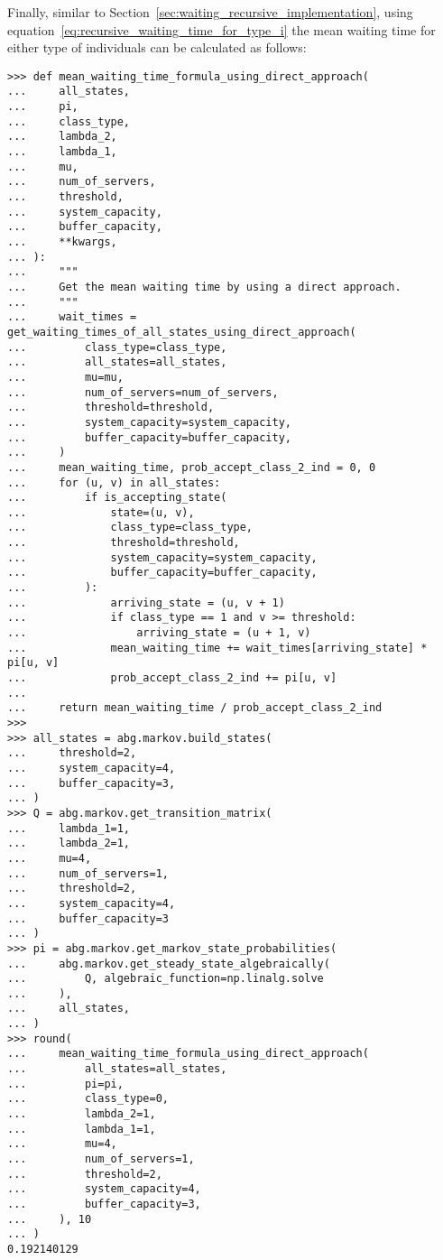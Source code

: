 Finally, similar to Section~\ref{sec:waiting_recursive_implementation}, using
equation~\eqref{eq:recursive_waiting_time_for_type_i} the mean waiting time
for either type of individuals can be calculated as follows:

\begin{lstlisting}[style=pystyle] 
>>> def mean_waiting_time_formula_using_direct_approach(
...     all_states,
...     pi,
...     class_type,
...     lambda_2,
...     lambda_1,
...     mu,
...     num_of_servers,
...     threshold,
...     system_capacity,
...     buffer_capacity,
...     **kwargs,
... ):
...     """
...     Get the mean waiting time by using a direct approach.
...     """
...     wait_times = get_waiting_times_of_all_states_using_direct_approach(
...         class_type=class_type,
...         all_states=all_states,
...         mu=mu,
...         num_of_servers=num_of_servers,
...         threshold=threshold,
...         system_capacity=system_capacity,
...         buffer_capacity=buffer_capacity,
...     )
...     mean_waiting_time, prob_accept_class_2_ind = 0, 0
...     for (u, v) in all_states:
...         if is_accepting_state(
...             state=(u, v),
...             class_type=class_type,
...             threshold=threshold,
...             system_capacity=system_capacity,
...             buffer_capacity=buffer_capacity,
...         ):
...             arriving_state = (u, v + 1)
...             if class_type == 1 and v >= threshold:
...                 arriving_state = (u + 1, v)
...             mean_waiting_time += wait_times[arriving_state] * pi[u, v]
...             prob_accept_class_2_ind += pi[u, v]
... 
...     return mean_waiting_time / prob_accept_class_2_ind
>>>
>>> all_states = abg.markov.build_states(
...     threshold=2,
...     system_capacity=4,
...     buffer_capacity=3,
... )
>>> Q = abg.markov.get_transition_matrix(
...     lambda_1=1,
...     lambda_2=1,
...     mu=4,
...     num_of_servers=1,
...     threshold=2,
...     system_capacity=4,
...     buffer_capacity=3
... )
>>> pi = abg.markov.get_markov_state_probabilities(
...     abg.markov.get_steady_state_algebraically(
...         Q, algebraic_function=np.linalg.solve
...     ),
...     all_states,
... )
>>> round(
...     mean_waiting_time_formula_using_direct_approach(
...         all_states=all_states,
...         pi=pi,
...         class_type=0,
...         lambda_2=1,
...         lambda_1=1,
...         mu=4,
...         num_of_servers=1,
...         threshold=2,
...         system_capacity=4,
...         buffer_capacity=3,
...     ), 10
... )
0.192140129

\end{lstlisting}


